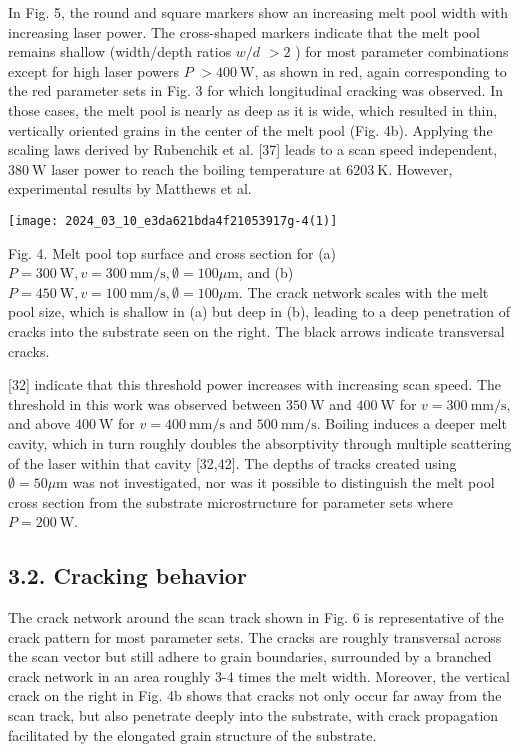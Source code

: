 \documentclass[10pt]{article}
\begin{document}
In Fig. 5, the round and square markers show an increasing melt pool width with increasing laser power. The cross-shaped markers indicate that the melt pool remains shallow (width/depth ratios $w / d$ $>2$ ) for most parameter combinations except for high laser powers $P$ $>400 \mathrm{~W}$, as shown in red, again corresponding to the red parameter sets in Fig. 3 for which longitudinal cracking was observed. In those cases, the melt pool is nearly as deep as it is wide, which resulted in thin, vertically oriented grains in the center of the melt pool (Fig. 4b). Applying the scaling laws derived by Rubenchik et al. [37] leads to a scan speed independent, $380 \mathrm{~W}$ laser power to reach the boiling temperature at $6203 \mathrm{~K}$. However, experimental results by Matthews et al.

\begin{center}
\texttt{[image: 2024\_03\_10\_e3da621bda4f21053917g-4(1)]}
\end{center}

Fig. 4. Melt pool top surface and cross section for (a) $P=300 \mathrm{~W}, v=300 \mathrm{~mm} / \mathrm{s}, \emptyset=100 \mu \mathrm{m}$, and (b) $P=450 \mathrm{~W}, v=100 \mathrm{~mm} / \mathrm{s}, \emptyset=100 \mu \mathrm{m}$. The crack network scales with the melt pool size, which is shallow in (a) but deep in (b), leading to a deep penetration of cracks into the substrate seen on the right. The black arrows indicate transversal cracks.

[32] indicate that this threshold power increases with increasing scan speed. The threshold in this work was observed between $350 \mathrm{~W}$ and $400 \mathrm{~W}$ for $v=300 \mathrm{~mm} / \mathrm{s}$, and above $400 \mathrm{~W}$ for $v=400 \mathrm{~mm} / \mathrm{s}$ and $500 \mathrm{~mm} / \mathrm{s}$. Boiling induces a deeper melt cavity, which in turn roughly doubles the absorptivity through multiple scattering of the laser within that cavity [32,42]. The depths of tracks created using $\emptyset=50 \mu \mathrm{m}$ was not investigated, nor was it possible to distinguish the melt pool cross section from the substrate microstructure for parameter sets where $P=200 \mathrm{~W}$.

\subsection*{3.2. Cracking behavior}
The crack network around the scan track shown in Fig. 6 is representative of the crack pattern for most parameter sets. The cracks are roughly transversal across the scan vector but still adhere to grain boundaries, surrounded by a branched crack network in an area roughly 3-4 times the melt width. Moreover, the vertical crack on the right in Fig. 4b shows that cracks not only occur far away from the scan track, but also penetrate deeply into the substrate, with crack propagation facilitated by the elongated grain structure of the substrate.
\end{document}
